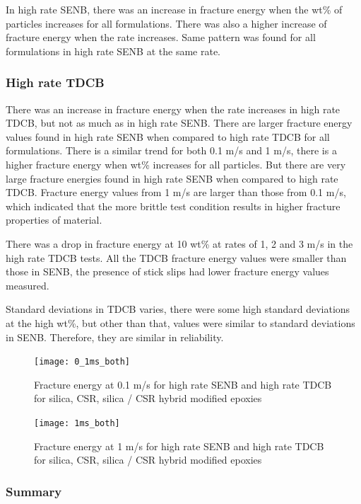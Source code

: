\documentclass[numbers=noendperiod,chapterprefix=on]{icldt} %
\begin{document}
In high rate SENB, there was an increase in fracture energy when the wt\% of particles increases for all formulations. There was also a higher increase of fracture energy when the rate increases. 
Same pattern was found for all formulations in high rate SENB at the same rate.

\subsubsection{High rate TDCB}

There was an increase in fracture energy when the rate increases in high rate TDCB, but not as much as in high rate SENB. There are larger fracture energy values found in high rate SENB when compared to high rate TDCB for all formulations. There is a similar trend for both 0.1 m/s and 1 m/s, there is a higher fracture energy when wt\% increases for all particles. But there are very large fracture energies found in high rate SENB when compared to high rate TDCB. Fracture energy values from 1 m/s are larger than those from 0.1 m/s, which indicated that the more brittle test condition results in higher fracture properties of material. 

There was a drop in fracture energy at 10 wt\% at rates of 1, 2 and 3 m/s in the high rate TDCB tests. All the TDCB fracture energy values were smaller than those in SENB, the presence of stick slips had lower fracture energy values measured.

Standard deviations in TDCB varies, there were some high standard deviations at the high wt\%, but other than that, values were similar to standard deviations in SENB. Therefore, they are similar in reliability.

\begin{figure}[!htpb]
\centering
\texttt{[image: 0\_1ms\_both]}
\caption{Fracture energy at 0.1 m/s for high rate SENB and high rate TDCB for silica, CSR, silica / CSR hybrid modified epoxies} \label{0_1ms_both}
\end{figure}
\FloatBarrier

\begin{figure}[!htpb]
\centering
\texttt{[image: 1ms\_both]}
\caption{Fracture energy at 1 m/s for high rate SENB and high rate TDCB for silica, CSR, silica / CSR hybrid modified epoxies} \label{1ms_both}
\end{figure}
\FloatBarrier



\subsubsection{Summary}
\end{document}
